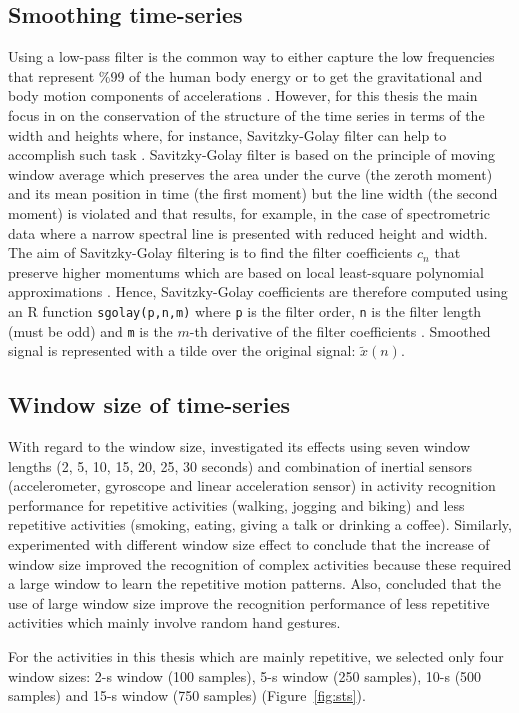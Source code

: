 \subsection{Smoothing time-series}
Using a low-pass filter is the common way to either capture the low 
frequencies that represent \%99 of the human body energy or to get the 
gravitational and body motion components of accelerations \citep{anguita2013}.
However, for this thesis the main focus in on the conservation of the 
structure of the time series in terms of the width and heights where, 
for instance, Savitzky-Golay filter can help to accomplish such task 
\citep{press1992}. Savitzky-Golay filter is based on the principle of moving 
window average which preserves the area under the curve (the zeroth moment)
and its mean position in time (the first moment) but the line width 
(the second moment) is violated and that results, for example, in the case 
of spectrometric data where a narrow spectral line is presented with 
reduced height and width. 
The aim of Savitzky-Golay filtering is to find the filter coefficients 
$c_n$ that preserve higher momentums which are based on local least-square 
polynomial approximations 
\citep{savitzkygolay1964, press1992, schafer2011}.
Hence, Savitzky-Golay coefficients are therefore computed using an R function 
\texttt{sgolay(p,n,m)} where \texttt{p} is the filter order, 
\texttt{n} is the filter length (must be odd) 
and \texttt{m} is the $m$-th derivative of the filter coefficients 
\citep{Rsignal}. Smoothed signal is represented with a tilde over the 
original signal: $\tilde{x}(n)$.



\subsection{Window size of time-series}
With regard to the window size, \cite{shoaib2016} investigated its effects 
using seven window lengths (2, 5, 10, 15, 20, 25, 30 seconds)
and combination of inertial sensors (accelerometer, gyroscope and linear 
acceleration sensor) in activity recognition performance for repetitive 
activities (walking, jogging and biking) and less repetitive activities 
(smoking, eating, giving a talk or drinking a coffee).
Similarly, \cite{shoaib2016} experimented with different window size effect 
to conclude that the increase of window size improved the recognition of 
complex activities because these required a large window to learn the 
repetitive motion patterns. Also, \cite{shoaib2016} concluded that the use 
of large window size improve the recognition performance of less repetitive 
activities which mainly involve random hand gestures.

For the activities in this thesis which are mainly repetitive, we selected 
only four window sizes: 2-s window (100 samples), 5-s window (250 samples), 
10-s (500 samples) and 15-s window (750 samples) (Figure~\ref{fig:sts}).




